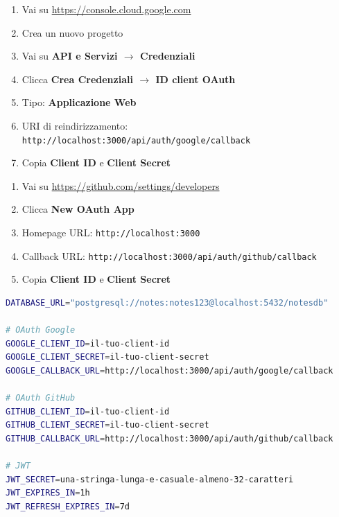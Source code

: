 \begin{praticabox}[title={Pratica --- Google OAuth}]
\begin{enumerate}
  \item Vai su \url{https://console.cloud.google.com}
  \item Crea un nuovo progetto
  \item Vai su \textbf{API e Servizi $\rightarrow$ Credenziali}
  \item Clicca \textbf{Crea Credenziali $\rightarrow$ ID client OAuth}
  \item Tipo: \textbf{Applicazione Web}
  \item URI di reindirizzamento: \texttt{http://localhost:3000/api/auth/google/callback}
  \item Copia \textbf{Client ID} e \textbf{Client Secret}
\end{enumerate}
\end{praticabox}

\begin{praticabox}[title={Pratica --- GitHub OAuth}]
\begin{enumerate}
  \item Vai su \url{https://github.com/settings/developers}
  \item Clicca \textbf{New OAuth App}
  \item Homepage URL: \texttt{http://localhost:3000}
  \item Callback URL: \texttt{http://localhost:3000/api/auth/github/callback}
  \item Copia \textbf{Client ID} e \textbf{Client Secret}
\end{enumerate}
\end{praticabox}

\begin{praticabox}[title={Pratica --- File \texttt{.env}}]
\begin{lstlisting}[language=bash]
DATABASE_URL="postgresql://notes:notes123@localhost:5432/notesdb"

# OAuth Google
GOOGLE_CLIENT_ID=il-tuo-client-id
GOOGLE_CLIENT_SECRET=il-tuo-client-secret
GOOGLE_CALLBACK_URL=http://localhost:3000/api/auth/google/callback

# OAuth GitHub
GITHUB_CLIENT_ID=il-tuo-client-id
GITHUB_CLIENT_SECRET=il-tuo-client-secret
GITHUB_CALLBACK_URL=http://localhost:3000/api/auth/github/callback

# JWT
JWT_SECRET=una-stringa-lunga-e-casuale-almeno-32-caratteri
JWT_EXPIRES_IN=1h
JWT_REFRESH_EXPIRES_IN=7d
\end{lstlisting}
\end{praticabox}

